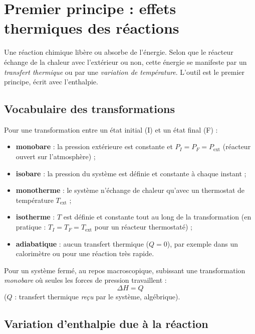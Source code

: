 \chapter{Premier principe : effets thermiques des réactions}
\label{ch:premier}

Une réaction chimique libère ou absorbe de l'énergie. Selon que le réacteur échange de la chaleur avec l'extérieur ou non, cette énergie se manifeste par un \emph{transfert thermique} ou par une \emph{variation de température}. L'outil est le premier principe, écrit avec l'enthalpie.

\section{Vocabulaire des transformations}

\begin{definition}
Pour une transformation entre un état initial (I) et un état final (F) :
\begin{itemize}
  \item \textbf{monobare} : la pression extérieure est constante et $P_I = P_F = P_{\text{ext}}$ (réacteur ouvert sur l'atmosphère) ;
  \item \textbf{isobare} : la pression du système est définie et constante à chaque instant ;
  \item \textbf{monotherme} : le système n'échange de chaleur qu'avec un thermostat de température $T_{\text{ext}}$ ;
  \item \textbf{isotherme} : $T$ est définie et constante tout au long de la transformation (en pratique : $T_I = T_F = T_{\text{ext}}$ pour un réacteur thermostaté) ;
  \item \textbf{adiabatique} : aucun transfert thermique ($Q = 0$), par exemple dans un calorimètre ou pour une réaction très rapide.
\end{itemize}
\end{definition}

\begin{rappel}
Pour un système fermé, au repos macroscopique, subissant une transformation \emph{monobare} où seules les forces de pression travaillent :
\[ \Delta H = Q \]
($Q$ : transfert thermique \emph{reçu} par le système, algébrique).
\end{rappel}

\section{Variation d'enthalpie due à la réaction}

